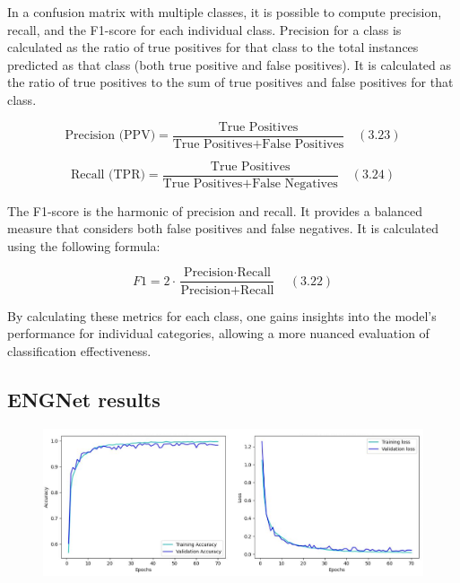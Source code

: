 \documentclass{Configuration_Files/PoliMi3i_thesis}
\begin{document}
In a confusion matrix with multiple classes, it is possible to compute precision, recall, and the F1-score for each individual class. Precision for a class is calculated as the ratio of true positives for that class to the total instances predicted as that class (both true positive and false positives). It is calculated as the ratio of true positives to the sum of true positives and false positives for that class.

\begin{equation}
	\text{Precision (PPV)} = \frac{\text{True Positives}}{\text{True Positives} + \text{False Positives}} \quad (3.23)
	\end{equation}
	
	\begin{equation}
	\text{Recall (TPR)} = \frac{\text{True Positives}}{\text{True Positives} + \text{False Negatives}} \quad (3.24)
	\end{equation}

The F1-score is the harmonic of precision and recall. It provides a balanced measure that considers both false positives and false negatives. It is calculated using the following formula:

\begin{equation}
	F1 = 2 \cdot \frac{\text{Precision} \cdot \text{Recall}}{\text{Precision} + \text{Recall}} \quad (3.22)
	\end{equation}

By calculating these metrics for each class, one gains insights into the model’s performance for individual categories, allowing a more nuanced evaluation of classification effectiveness.



\subsection{ENGNet results}

\begin{figure}[H]
	\includegraphics[scale=0.25]{trainingAccuracyDavide.png}
	\centering
	\end{figure}
\end{document}
